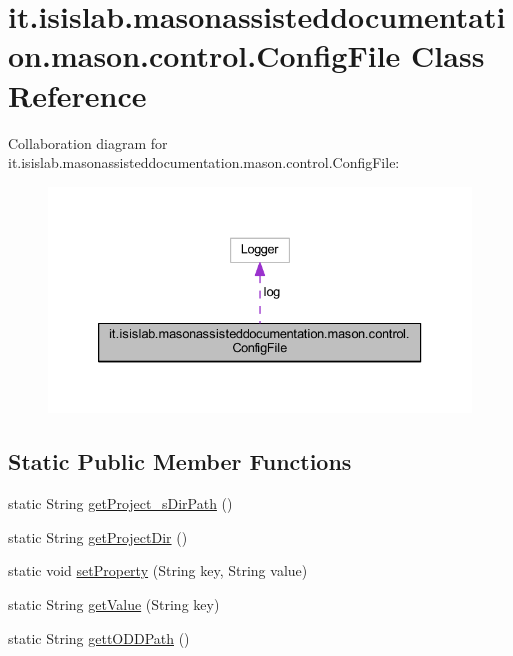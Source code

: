 \hypertarget{classit_1_1isislab_1_1masonassisteddocumentation_1_1mason_1_1control_1_1_config_file}{\section{it.\-isislab.\-masonassisteddocumentation.\-mason.\-control.\-Config\-File Class Reference}
\label{classit_1_1isislab_1_1masonassisteddocumentation_1_1mason_1_1control_1_1_config_file}
}


Collaboration diagram for it.\-isislab.\-masonassisteddocumentation.\-mason.\-control.\-Config\-File\-:
\nopagebreak
\begin{figure}[H]
\begin{center}
\leavevmode
\includegraphics[width=333pt]{classit_1_1isislab_1_1masonassisteddocumentation_1_1mason_1_1control_1_1_config_file__coll__graph}
\end{center}
\end{figure}
\subsection*{Static Public Member Functions}
\begin{DoxyCompactItemize}
\item 
static String \hyperlink{classit_1_1isislab_1_1masonassisteddocumentation_1_1mason_1_1control_1_1_config_file_add444e913763f18b80005e5ad477c59d}{get\-Project\-\_\-s\-Dir\-Path} ()
\item 
static String \hyperlink{classit_1_1isislab_1_1masonassisteddocumentation_1_1mason_1_1control_1_1_config_file_a67bf373e54fb3ce5144d6f4fcbb48bfd}{get\-Project\-Dir} ()
\item 
static void \hyperlink{classit_1_1isislab_1_1masonassisteddocumentation_1_1mason_1_1control_1_1_config_file_ae68816366df216e1d9525047c91e77fc}{set\-Property} (String key, String value)
\item 
static String \hyperlink{classit_1_1isislab_1_1masonassisteddocumentation_1_1mason_1_1control_1_1_config_file_abb43073f42616e4349b2fcb4e964c648}{get\-Value} (String key)
\item 
static String \hyperlink{classit_1_1isislab_1_1masonassisteddocumentation_1_1mason_1_1control_1_1_config_file_a69e02ec967d2a3c44d590d146036d816}{gett\-O\-D\-D\-Path} ()
\end{DoxyCompactItemize}
